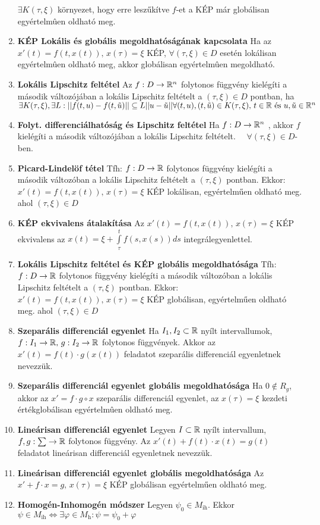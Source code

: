 \documentclass{article}
\begin{document}
\begin{enumerate}
	$\exists K(\tau,\xi)$ környezet, hogy erre leszűkítve $f$-et  a KÉP már globálisan egyértelmûen oldható meg.
	\item\textbf{KÉP Lokális és globális megoldhatóságának kapcsolata}\br
	Ha az $x'(t)=f(t, x(t))\text{,  }x(\tau)=\xi$ KÉP, $\forall(\tau,\xi)\in D$
	esetén lokálisan egyértelmûen oldható meg, akkor globálisan egyértelmûen megoldható.
	\item\textbf{Lokális Lipschitz feltétel}\br
	Az $f:D\rightarrow\mathbb{R}^n$ folytonos függvény kielégíti a második változójában a lokális Lipschitz
	feltételt a $(\tau,\xi)\in D$ pontban, ha $\exists K(\tau,\xi),\exists
	L:||f(t,u)-f(t,\tilde{u})||\subseteq L||u-\tilde{u}||\br\forall(t,u),(t,
	\tilde{u})\in K(\tau,\xi)\text{,  }t\in\R\text{  és  }u,\tilde{u}\in\R^n$
	\item\textbf{Folyt. differenciálhatóság és Lipschitz feltétel}\br
	Ha $f:D\rightarrow\mathbb{R}^n$ \folytdifh, akkor $f$ kielégíti a második változójában a lokális Lipschitz feltételt.
	$\quad\forall(\tau,\xi)\in D$-ben.
	\item\textbf{Picard-Lindelöf tétel}\br
	Tfh: $f:D\rightarrow\mathbb{R}$ folytonos függvény kielégíti a második változóban a lokális Lipschitz feltételt a
	$(\tau,\xi)$ pontban. Ekkor: $x'(t)=f(t, x(t))\text{,  }x(\tau)=\xi$ KÉP lokálisan, egyértelműen oldható meg.\br
	ahol $(\tau,\xi)\in D$
	\item\textbf{KÉP ekvivalens átalakítása}\br
	Az $x'(t)=f(t, x(t))\text{,  }x(\tau)=\xi$ KÉP ekvivalens az $x(t)=\xi+
	\int\limits_{\tau}^{t}f(s,x(s))ds$ integrálegyenlettel.
	\item\textbf{Lokális Lipschitz feltétel és KÉP globális megoldhatósága}\br
	Tfh: $f:D\rightarrow\mathbb{R}$ folytonos függvény kielégíti a második változóban a lokális Lipschitz feltételt a
	$(\tau,\xi)$ pontban. Ekkor: $x'(t)=f(t, x(t))\text{,  }x(\tau)=\xi$ KÉP globálisan, egyértelműen oldható meg.\br
	ahol $(\tau,\xi)\in D$
	\item\textbf{Szeparális differenciál egyenlet}\br
	Ha $I_1,I_2\subset\mathbb{R}$ nyílt intervallumok, $f:I_1\rightarrow\mathbb{R}\text{,  }
	g:I_2\rightarrow\mathbb{R}$ folytonos függvények.\br
	Akkor az $x'(t)=f(t)\cdot g(x(t))$ feladatot szeparális differenciál egyenletnek nevezzük.
	\item\textbf{Szeparális differenciál egyenlet globális megoldhatósága}\br
	Ha $0\notin R_g$, akkor az $x'=f\cdot g \circ x$ szeparális differenciál egyenlet, az 
	$x(\tau)=\xi$ kezdeti érték\br globálisan egyértelmûen oldható meg.
	\item\textbf{Lineárisan differenciál egyenlet}\br
	Legyen $I\subset\mathbb{R}$ nyílt intervallum, $f,g:\sum\rightarrow\mathbb{R}$ folytonos függvény.
	Az $x'(t)+f(t)\cdot x(t)=g(t)$ feladatot lineárisan differenciál egyenletnek nevezzük.
	\item\textbf{Lineárisan differenciál egyenlet globális megoldhatósága}\br
	Az $x'+f\cdot x=g\text{,  }x(\tau)=\xi$ KÉP globálisan egyértelműen oldható meg.
	\item\textbf{Homogén-Inhomogén módszer}\br
	Legyen $\psi_0\in M_{\text{ih}}$. Ekkor $\psi\in M_{\text{ih}}\Leftrightarrow
	\exists\varphi\in M_{\text{h}}:\psi=\psi_0+\varphi$
\end{enumerate}
\end{document}
